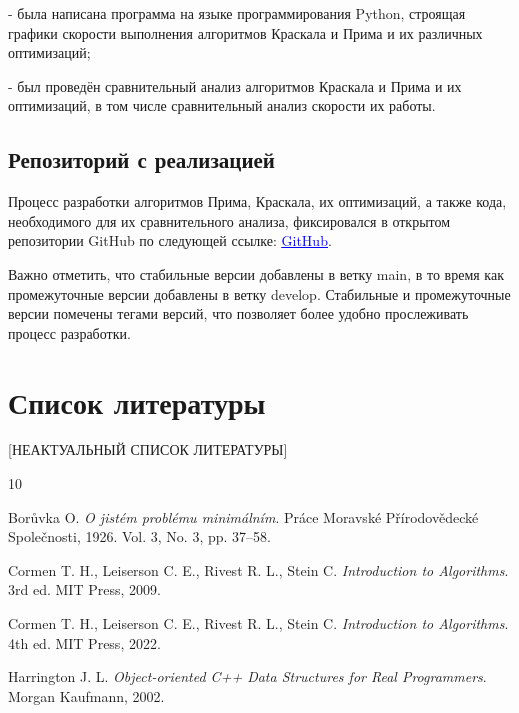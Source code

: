 	- была написана программа на языке программирования Python, строящая графики скорости выполнения алгоритмов Краскала и Прима и их различных оптимизаций;
	
	- был проведён сравнительный анализ алгоритмов Краскала и Прима и их оптимизаций, в том числе сравнительный анализ скорости их работы.
	
	\subsection{Репозиторий с реализацией}
	
	\hspace{0.5 cm}
	
	Процесс разработки алгоритмов Прима, Краскала, их оптимизаций, а также кода, необходимого для их сравнительного анализа, фиксировался в открытом репозитории GitHub по следующей ссылке: \href{https://github.com/dan1lka257/graduate_work}{\textcolor{blue}{\underline{GitHub}}}.
	
	Важно отметить, что стабильные версии добавлены в ветку main, в то время как промежуточные версии добавлены в ветку develop. Стабильные и промежуточные версии помечены тегами версий, что позволяет более удобно прослеживать процесс разработки.
	
	\newpage
	
	\section{Список литературы}
	
	[НЕАКТУАЛЬНЫЙ СПИСОК ЛИТЕРАТУРЫ]
	\begingroup
	\renewcommand{\section}[2]{}
	\begin{thebibliography}{10}
		
		Borůvka O.
		\textit{O jistém problému minimálním}.
		Práce Moravské Přírodovědecké Společnosti, 1926.
		Vol. 3, No. 3, pp. 37--58.
		
		Cormen T. H., Leiserson C. E., Rivest R. L., Stein C.
		\textit{Introduction to Algorithms}.
		3rd ed. MIT Press, 2009.
		
		Cormen T. H., Leiserson C. E., Rivest R. L., Stein C.
		\textit{Introduction to Algorithms}.
		4th ed. MIT Press, 2022.
		
		Harrington J. L.
		\textit{Object-oriented C++ Data Structures for Real Programmers}.
		Morgan Kaufmann, 2002.
		
	\end{thebibliography}
	\endgroup
